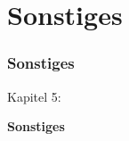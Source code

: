 %

\section{Sonstiges}
\begin{frame}[fragile]
	\frametitle{Sonstiges}

	\begin{center}\huge{Kapitel 5:}\end{center}
	\begin{center}\huge{\color{typo3darkgrey}\textbf{Sonstiges}}\end{center}

\end{frame}


